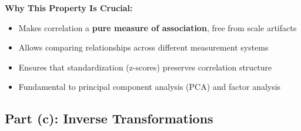 \documentclass[12pt]{article}
\begin{document}
\begin{explanation}
\textbf{Why This Property Is Crucial:}

\begin{itemize}
    \item Makes correlation a \textbf{pure measure of association}, free from scale artifacts
    \item Allows comparing relationships across different measurement systems
    \item Ensures that standardization (z-scores) preserves correlation structure
    \item Fundamental to principal component analysis (PCA) and factor analysis
\end{itemize}
\end{explanation}

\subsection{Part (c): Inverse Transformations}
\end{document}
